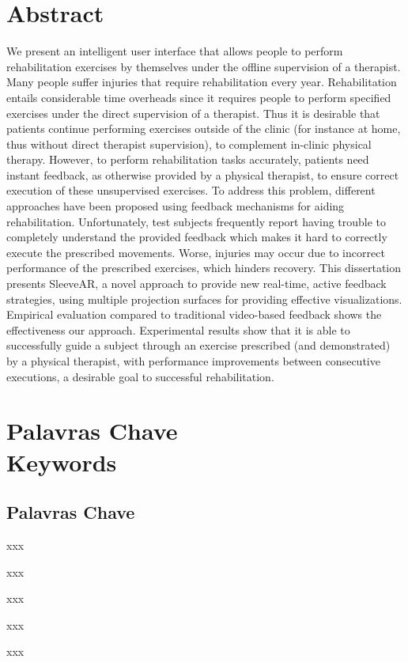 \chapter*{Abstract}
\thispagestyle{empty}

We present an intelligent user interface that allows people to perform rehabilitation exercises by themselves under the offline supervision of a therapist.  Many people suffer injuries that require rehabilitation every year. Rehabilitation entails considerable time overheads since it requires people to perform specified exercises under the direct supervision of a therapist. Thus it is desirable that patients continue performing exercises outside of the clinic (for instance at home, thus without direct therapist supervision), to complement in-clinic physical therapy.
However, to perform rehabilitation tasks accurately, patients need instant feedback, as otherwise provided by a physical therapist, to ensure correct execution of these unsupervised exercises. 
To address this problem, different approaches have been proposed using feedback mechanisms for aiding rehabilitation. 
Unfortunately, test subjects frequently report having trouble to completely understand the provided feedback which makes it hard to correctly execute the prescribed movements. 
Worse, injuries may occur due to incorrect performance of the prescribed exercises, which hinders recovery. This dissertation presents SleeveAR, a novel approach to provide new real-time, active feedback strategies, using multiple projection surfaces for providing effective visualizations.
Empirical evaluation compared to traditional video-based feedback shows the effectiveness our approach. Experimental results show that it is able to successfully guide a subject through an exercise prescribed (and demonstrated) by a physical therapist, with performance improvements between consecutive executions, a desirable goal to successful rehabilitation.


\newpage


\chapter*{Palavras Chave \\ Keywords}
\thispagestyle{empty}

\section*{Palavras Chave}
{\large %

\noindent xxx

\noindent xxx

\noindent xxx

\noindent xxx

\noindent xxx

}

